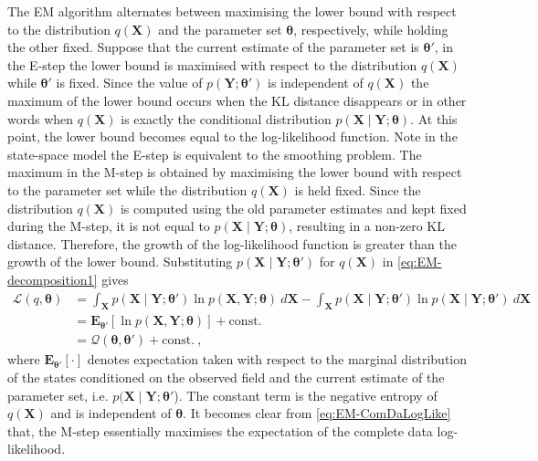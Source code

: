 \documentclass[review,authoryear,3p]{elsarticle}
\begin{document}
The EM algorithm alternates between maximising the lower bound with respect to the distribution $q(\mathbf X)$ and the parameter set $\boldsymbol\theta$, respectively, while holding the other fixed. Suppose that the current estimate of the parameter set is $\boldsymbol\theta'$, in the E-step the lower bound is maximised with respect to the distribution $q(\mathbf X)$ while $\boldsymbol\theta'$ is fixed. Since the value of $p(\mathbf Y;\boldsymbol\theta')$ is independent of $q(\mathbf X)$ the maximum of the lower bound occurs when the KL distance disappears or in other words when $q(\mathbf X)$ is exactly the conditional distribution $p(\mathbf X \mid \mathbf Y;\boldsymbol\theta)$. At this point, the lower bound becomes equal to the log-likelihood function. Note in the state-space model the E-step is equivalent to the smoothing problem. The maximum in the M-step is obtained by maximising the lower bound with respect to the parameter set while the distribution $q(\mathbf X)$ is held fixed. Since the distribution $q(\mathbf X)$ is computed using the old parameter estimates and kept fixed during the M-step, it is not equal to $p(\mathbf X \mid \mathbf Y;\boldsymbol\theta)$, resulting in a non-zero KL distance. Therefore, the growth of the log-likelihood function is greater than the growth of the lower bound. Substituting $p(\mathbf X \mid \mathbf Y;\boldsymbol\theta')$ for $q(\mathbf X)$ in \eqref{eq:EM-decomposition1} gives
\begin{align}
 \mathcal{L}(q,\boldsymbol\theta)&=\int_{\mathbf X} p(\mathbf X\mid\mathbf Y;\boldsymbol\theta')\ln p(\mathbf X,\mathbf Y;\boldsymbol\theta)~d\mathbf X-\int_{\mathbf X} p(\mathbf X\mid\mathbf Y;\boldsymbol\theta')\ln p(\mathbf X\mid\mathbf Y;\boldsymbol\theta')~d\mathbf X \nonumber \\
&= \mathbf E_{\boldsymbol\theta'}\left[ \ln p(\mathbf X,\mathbf Y;\boldsymbol\theta)\right] +\mathrm{const.}\nonumber\\
&=\mathcal{Q}(\boldsymbol\theta,\boldsymbol\theta')+\mathrm{const.}~,\label{eq:EM-ComDaLogLike}
\end{align}
where $ \mathbf E_{\boldsymbol \theta'}\left[ \cdot\right] $ denotes expectation taken with respect to the marginal distribution of the states conditioned on the observed field and the current estimate of the parameter set, i.e.  $p(\mathbf X\mid\mathbf Y;\boldsymbol \theta'$). The constant term is the negative entropy of $q(\mathbf X)$ and is independent of $\boldsymbol\theta$.   It becomes clear from \eqref{eq:EM-ComDaLogLike} that, the M-step essentially maximises the expectation of the complete data log-likelihood. 
\end{document}

